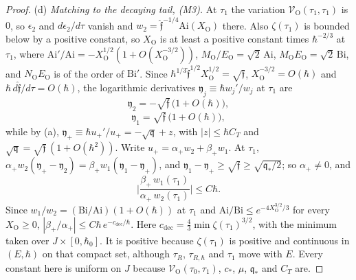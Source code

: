 \documentclass[aps,prd,onecolumn,tightenlines,nofootinbib,notitlepage,11pt,floatfix]{revtex4-2}
\theoremstyle{indentedtheorem}
\begin{document}
\begin{proof}
(d) \emph{Matching to the decaying tail, (M3).} At $\tau_1$ the variation $\mathcal{V}_\text{O}(\tau_1,\tau_1)$ is $0$, so $\epsilon_2$ and $d\epsilon_2/d\tau$ vanish and $w_2=\hat{\mathfrak{f}}^{-1/4}\mathrm{Ai}(X_\text{O})$ there. Also $\zeta(\tau_1)$ is bounded below by a positive constant, so $X_\text{O}$ is at least a positive constant times $\hbar^{-2/3}$ at $\tau_1$, where $\mathrm{Ai}'/\mathrm{Ai}=-X_\text{O}^{1/2}(1+O(X_\text{O}^{-3/2}))$, $M_\text{O}/E_\text{O}=\sqrt{2}\,\mathrm{Ai}$, $M_\text{O}E_\text{O}=\sqrt{2}\,\mathrm{Bi}$, and $N_\text{O}E_\text{O}$ is of the order of $\mathrm{Bi}'$. Since $\hbar^{1/3}\hat{\mathfrak{f}}^{1/2}X_\text{O}^{1/2}=\sqrt{\mathfrak{f}}$, $X_\text{O}^{-3/2}=O(\hbar)$ and $\hbar\,d\hat{\mathfrak{f}}/d\tau=O(\hbar)$, the logarithmic derivatives $\mathfrak{y}_j\equiv\hbar w_j'/w_j$ at $\tau_1$ are
\begin{equation*}
    \mathfrak{y}_2 = -\sqrt{\mathfrak{f}}\,\big(1+O(\hbar)\big) ,
\end{equation*}
\begin{equation*}
    \mathfrak{y}_1 = \sqrt{\mathfrak{f}}\,\big(1+O(\hbar)\big) ,
\end{equation*}
while by (a), $\mathfrak{y}_+\equiv\hbar u_+'/u_+=-\sqrt{\mathfrak{q}}+z$, with $|z|\leq\hbar C_T$ and $\sqrt{\mathfrak{q}}=\sqrt{\mathfrak{f}}\,(1+O(\hbar^2))$. Write $u_+=\alpha_+w_2+\beta_+w_1$. At $\tau_1$, $\alpha_+w_2(\mathfrak{y}_+-\mathfrak{y}_2)=\beta_+w_1(\mathfrak{y}_1-\mathfrak{y}_+)$, and $\mathfrak{y}_1-\mathfrak{y}_+\geq\sqrt{\mathfrak{f}}\geq\sqrt{\mathfrak{q}_*/2}$; so $\alpha_+\neq0$, and
\begin{equation*}
    \Big|\frac{\beta_+\,w_1(\tau_1)}{\alpha_+\,w_2(\tau_1)}\Big| \leq C\hbar .
\end{equation*}
Since $w_1/w_2=(\mathrm{Bi}/\mathrm{Ai})(1+O(\hbar))$ at $\tau_1$ and $\mathrm{Ai}/\mathrm{Bi}\leq e^{-4X_\text{O}^{3/2}/3}$ for every $X_\text{O}\geq0$, $|\beta_+/\alpha_+|\leq C\hbar\,e^{-c_\text{dec}/\hbar}$. Here $c_\text{dec}=\tfrac{4}{3}\min\zeta(\tau_1)^{3/2}$, with the minimum taken over $J\times[0,\hbar_0]$. It is positive because $\zeta(\tau_1)$ is positive and continuous in $(E,\hbar)$ on that compact set, although $\tau_R$, $\tau_{R,\hbar}$ and $\tau_1$ move with $E$. Every constant here is uniform on $J$ because $\mathcal{V}_\text{O}(\tau_0,\tau_1)$, $c_*$, $\mu$, $\mathfrak{q}_*$ and $C_T$ are.


\end{proof}
\end{document}
